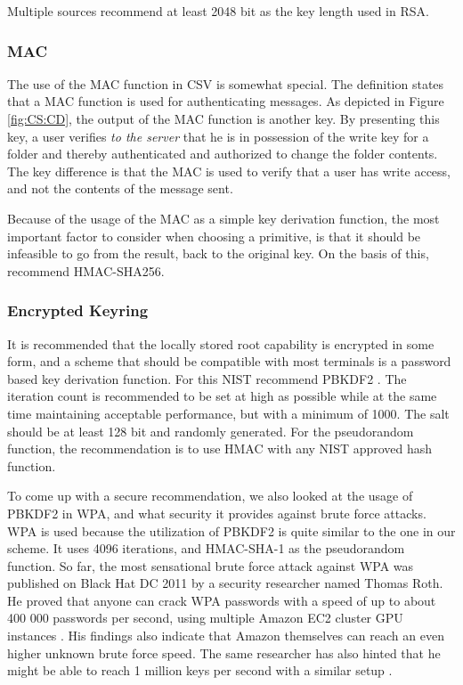 \documentclass[pdftex,english,10pt,b5paper,twoside]{book}
\begin{document}
Multiple sources \cite{keylength} recommend at least 2048 bit as the key length
used in \ac{RSA}.

\subsubsection{\ac{MAC}}

The use of the \ac{MAC} function in \ac{CSV} is somewhat special. The
definition states that a MAC function is used for authenticating messages.  As
depicted in Figure \ref{fig:CS:CD}, the output of the \ac{MAC} function is
another key. By presenting this key, a user verifies \emph{to the server} that
he is in possession of the write key for a folder and thereby authenticated and
authorized to change the folder contents. The key difference is that the
\ac{MAC} is used to verify that a user has write access, and not the contents
of the message sent.

Because of the usage of the \ac{MAC} as a simple key derivation function, the
most important factor to consider when choosing a primitive, is that it should
be infeasible to go from the result, back to the original key. On the basis of
this, \citet{schneier} recommend HMAC-SHA256.

\subsubsection{Encrypted Keyring} 
\label{sec:PBKD}

It is recommended that the locally stored root capability is encrypted in some
form, and a scheme that should be compatible with most terminals is a password
based key derivation function. For this \ac{NIST} recommend \ac{PBKDF2}
\cite{pbkdf_nist}. The iteration count is recommended to be set at high as
possible while at the same time maintaining acceptable performance, but with a
minimum of 1000. The salt should be at least 128 bit and randomly generated.
For the pseudorandom function, the recommendation is to use \ac{HMAC} with any
\ac{NIST} approved hash function.

To come up with a secure recommendation, we also looked at the usage of
\ac{PBKDF2} in \ac{WPA}, and what security it provides against brute force
attacks.  \ac{WPA} is used because the utilization of \ac{PBKDF2} is quite
similar to the one in our scheme. It uses 4096 iterations, and
\ac{HMAC}-\ac{SHA}-1 as the pseudorandom function. So far, the most sensational
brute force attack against \ac{WPA} was published on Black Hat DC 2011 by a
security researcher named Thomas Roth. He proved that anyone can crack \ac{WPA}
passwords with a speed of up to about 400 000 passwords per second, using
multiple Amazon \ac{EC2} cluster \ac{GPU} instances \cite{rothwpa}. His
findings also indicate that Amazon themselves can reach an even higher unknown
brute force speed. The same researcher has also hinted that he might be able to
reach 1 million keys per second with a similar setup \cite{rothblog}.
\end{document}
